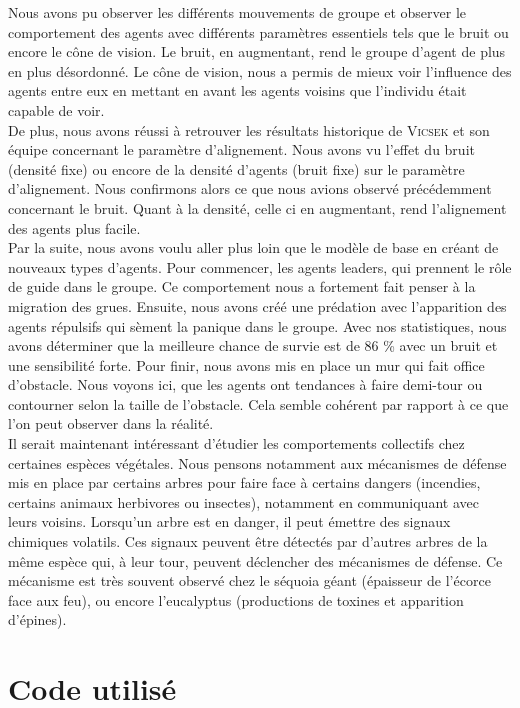 \documentclass[french, a4paper, 12pt, openany]{report}
\begin{document}
    Nous avons pu observer les différents mouvements de groupe et observer le comportement des agents avec différents paramètres essentiels tels que le bruit ou encore le cône de vision. Le bruit, en augmentant, rend le groupe d'agent de plus en plus désordonné. Le cône de vision, nous a permis de mieux voir l'influence des agents entre eux en mettant en avant les agents voisins que l'individu était capable de voir.\\
    
    De plus, nous avons réussi à retrouver les résultats historique de \textsc{Vicsek} et son équipe concernant le paramètre d'alignement. Nous avons vu l'effet du bruit (densité fixe) ou encore de la densité d'agents (bruit fixe) sur le paramètre d'alignement. Nous confirmons alors ce que nous avions observé précédemment concernant le bruit. Quant à la densité, celle ci en augmentant, rend l'alignement des agents plus facile. \\
    
    Par la suite, nous avons voulu aller plus loin que le modèle de base en créant de nouveaux types d'agents. Pour commencer, les agents leaders, qui prennent le rôle de guide dans le groupe. Ce comportement nous a fortement fait penser à la migration des grues. 
    Ensuite, nous avons créé une prédation avec l'apparition des agents répulsifs qui sèment la panique dans le groupe. Avec nos statistiques, nous avons déterminer que la meilleure chance de survie est de 86 \% avec un bruit et une sensibilité forte. 
    Pour finir, nous avons mis en place un mur qui fait office d'obstacle. Nous voyons ici, que les agents ont tendances à faire demi-tour ou contourner selon la taille de l'obstacle. Cela semble cohérent par rapport à ce que l'on peut observer dans la réalité.\\
    
    Il serait maintenant intéressant d'étudier les comportements collectifs chez certaines espèces végétales. Nous pensons notamment aux mécanismes de défense mis en place par certains arbres pour faire face à certains dangers (incendies, certains animaux herbivores ou insectes), notamment en communiquant avec leurs voisins. Lorsqu'un arbre est en danger, il peut émettre des signaux chimiques volatils. Ces signaux peuvent être détectés par d'autres arbres de la même espèce qui, à leur tour, peuvent déclencher des mécanismes de défense. Ce mécanisme est très souvent observé chez le séquoia géant (épaisseur de l'écorce face aux feu), ou encore l'eucalyptus (productions de toxines et apparition d'épines). 



\appendix
\chapter{Code utilisé}

\end{document}
